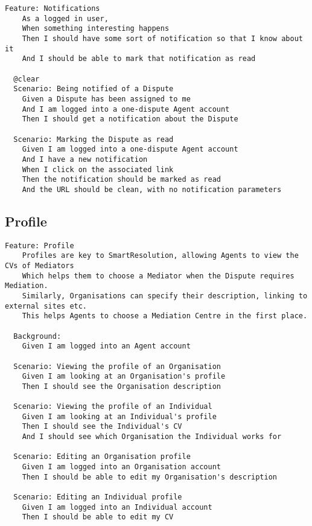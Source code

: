 \begin{lstlisting}
Feature: Notifications
    As a logged in user,
    When something interesting happens
    Then I should have some sort of notification so that I know about it
    And I should be able to mark that notification as read

  @clear
  Scenario: Being notified of a Dispute
    Given a Dispute has been assigned to me
    And I am logged into a one-dispute Agent account
    Then I should get a notification about the Dispute

  Scenario: Marking the Dispute as read
    Given I am logged into a one-dispute Agent account
    And I have a new notification
    When I click on the associated link
    Then the notification should be marked as read
    And the URL should be clean, with no notification parameters

\end{lstlisting}

\subsection{Profile}

\begin{lstlisting}
Feature: Profile
    Profiles are key to SmartResolution, allowing Agents to view the CVs of Mediators
    Which helps them to choose a Mediator when the Dispute requires Mediation.
    Similarly, Organisations can specify their description, linking to external sites etc.
    This helps Agents to choose a Mediation Centre in the first place.

  Background:
    Given I am logged into an Agent account

  Scenario: Viewing the profile of an Organisation
    Given I am looking at an Organisation's profile
    Then I should see the Organisation description

  Scenario: Viewing the profile of an Individual
    Given I am looking at an Individual's profile
    Then I should see the Individual's CV
    And I should see which Organisation the Individual works for

  Scenario: Editing an Organisation profile
    Given I am logged into an Organisation account
    Then I should be able to edit my Organisation's description

  Scenario: Editing an Individual profile
    Given I am logged into an Individual account
    Then I should be able to edit my CV

\end{lstlisting}

